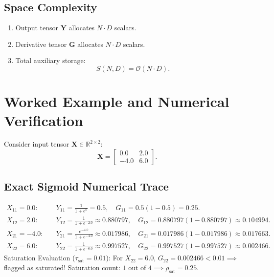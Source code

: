 \documentclass[11pt]{article}
\begin{document}
\subsection{Space Complexity}
\begin{enumerate}
    \item Output tensor $\mathbf{Y}$ allocates $N \cdot D$ scalars.
    \item Derivative tensor $\mathbf{G}$ allocates $N \cdot D$ scalars.
    \item Total auxiliary storage:
    \begin{equation}
    S(N, D) = \mathcal{O}(N \cdot D).
    \end{equation}
\end{enumerate}

\section{Worked Example and Numerical Verification}
\label{sec:worked_example}

Consider input tensor $\mathbf{X} \in \mathbb{R}^{2 \times 2}$:
\begin{equation}
\mathbf{X} = \begin{bmatrix} 0.0 & 2.0 \\ -4.0 & 6.0 \end{bmatrix}.
\end{equation}

\subsection{Exact Sigmoid Numerical Trace}
\begin{align}
X_{11} = 0.0: & \quad Y_{11} = \frac{1}{1 + e^0} = 0.5, \quad G_{11} = 0.5(1 - 0.5) = 0.25. \\
X_{12} = 2.0: & \quad Y_{12} = \frac{1}{1 + e^{-2.0}} \approx 0.880797, \quad G_{12} = 0.880797(1 - 0.880797) \approx 0.104994. \\
X_{21} = -4.0: & \quad Y_{21} = \frac{e^{-4.0}}{1 + e^{-4.0}} \approx 0.017986, \quad G_{21} = 0.017986(1 - 0.017986) \approx 0.017663. \\
X_{22} = 6.0: & \quad Y_{22} = \frac{1}{1 + e^{-6.0}} \approx 0.997527, \quad G_{22} = 0.997527(1 - 0.997527) \approx 0.002466.
\end{align}
Saturation Evaluation ($\tau_{\text{sat}} = 0.01$):
For $X_{22} = 6.0$, $G_{22} = 0.002466 < 0.01 \implies$ flagged as saturated!
Saturation count: $1$ out of $4 \implies \rho_{\text{sat}} = 0.25$.
\end{document}
